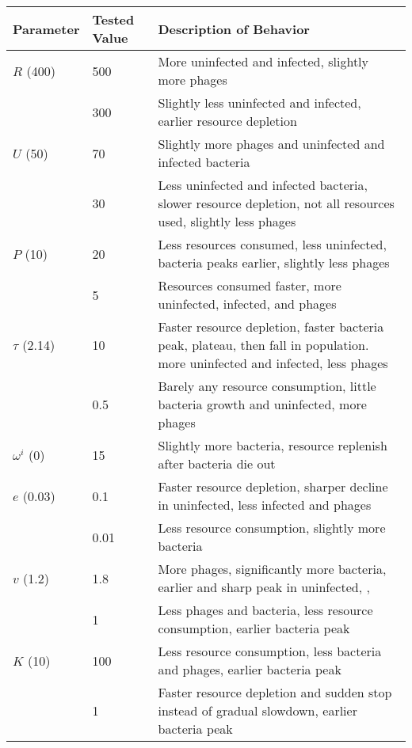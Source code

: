 \begin{table}
    \small %
    \centering
    \begin{tabularx}{\textwidth}{l l X}
        \toprule
        \textbf{Parameter} & \textbf{Tested Value} & \textbf{Description of Behavior} \\
        \midrule
        $R$ (400) & 500 & More uninfected and infected, slightly more phages\\
         & 300 & Slightly less uninfected and infected, earlier resource depletion\\

        \midrule
        $U$ (50) & 70 & Slightly more phages and uninfected and infected bacteria\\
         & 30 & Less uninfected and infected bacteria, slower resource depletion, not all resources used, slightly less phages \\

        \midrule
        $P$ (10) & 20 & Less resources consumed, less uninfected, bacteria peaks earlier, slightly less phages\\
         & 5 & Resources consumed faster, more uninfected, infected, and phages\\

        \midrule
        $\tau$ (2.14) & 10 & Faster resource depletion, faster bacteria peak, plateau, then fall in population. more uninfected and infected, less phages\\
         & 0.5& Barely any resource consumption, little bacteria growth and uninfected, more phages\\

        \midrule
        $\omega^i$ (0) & 15 & Slightly more bacteria, resource replenish after bacteria die out\\

        \midrule
        $e$ (0.03) & 0.1 & Faster resource depletion, sharper decline in uninfected, less infected and phages \\
         & 0.01 & Less resource consumption, slightly more bacteria\\

        \midrule
        $v$ (1.2) & 1.8 & More phages, significantly more bacteria, earlier and sharp peak in uninfected, , \\
         & 1 & Less phages and bacteria, less resource consumption, earlier bacteria peak\\

        \midrule
        $K$ (10) & 100 & Less resource consumption, less bacteria and phages, earlier bacteria peak\\
         & 1 & Faster resource depletion and sudden stop instead of gradual slowdown, earlier bacteria peak\\


\end{tabularx}
\end{table}
